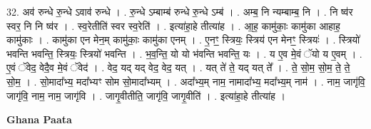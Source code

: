 \documentclass[17pt]{extarticle}
\begin{document}
32. अव॑ रुन्धे रु॒न्धे ऽवाव॑ रुन्धे । . रु॒न्धे ऽम्बाम्ब॑ रुन्धे रु॒न्धे ऽम्ब॑ । . अम्ब॒ नि न्यम्बाम्ब॒ नि । . नि ष्व॑र स्वर॒ नि नि ष्व॑र । . स्व॒रेतीति॑ स्वर स्व॒रेति॑ । . इत्या॑हा॒हे तीत्या॑ह । . आ॒ह॒ कामु॑काः॒ कामु॑का आहाह॒ कामु॑काः । . कामु॑का एन मेन॒म् कामु॑काः॒ कामु॑का एनम् । . ए॒नꣳ॒॒ स्त्रियः॒ स्त्रिय॑ एन मेनꣳ॒॒ स्त्रियः॑ । . स्त्रियो॑ भवन्ति भवन्ति॒ स्त्रियः॒ स्त्रियो॑ भवन्ति । . भ॒व॒न्ति॒ यो यो भ॑वन्ति भवन्ति॒ यः । . य ए॒व मे॒वं ॅयो य ए॒वम् । . ए॒वं ॅवेद॒ वेदै॒व मे॒वं ॅवेद॑ । . वेद॒ यद् यद् वेद॒ वेद॒ यत् । . यत् ते॑ ते॒ यद् यत् ते᳚ । . ते॒ सो॒म॒ सो॒म॒ ते॒ ते॒ सो॒म॒ । . सो॒मादा᳚भ्य॒ मदा᳚भ्यꣳ सोम सो॒मादा᳚भ्यम् । . अदा᳚भ्य॒म् नाम॒ नामादा᳚भ्य॒ मदा᳚भ्य॒म् नाम॑ । . नाम॒ जागृ॑वि॒ जागृ॑वि॒ नाम॒ नाम॒ जागृ॑वि । . जागृ॒वीतीति॒ जागृ॑वि॒ जागृ॒वीति॑ । . इत्या॑हा॒हे तीत्या॑ह । \newline

\textbf{Ghana Paata } \newline
\end{document}

